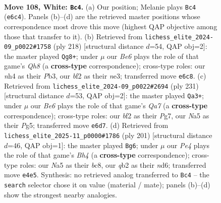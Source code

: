\documentclass[11pt]{article}
\begin{document}
\clearpage

\begin{figure}[p]\centering
\begin{subfigure}{0.46\textwidth}\centering
\resizebox{\linewidth}{!}{%
\newchessgame
\chessboard[
  setfen={8/6k1/n3B3/N7/Pp2P2n/8/1q3b1p/3K4 w - - 8 108},
  showmover=false,
  pgfstyle=straightmove, color=movearrow, markmove={e6-c4}
]}
\caption{}
\end{subfigure}\hfill
\begin{subfigure}{0.46\textwidth}\centering
\resizebox{\linewidth}{!}{%
\newchessgame
\chessboard[
  setfen={7Q/1p6/p7/P1K5/8/1P2n3/2P3k1/5q2 w - - 0 110},
  showmover=false,
  pgfstyle=straightmove, color=movearrow, markmove={h8-g8}
]}
\caption{}
\end{subfigure}
\\[4pt]
\begin{subfigure}{0.46\textwidth}\centering
\resizebox{\linewidth}{!}{%
\newchessgame
\chessboard[
  setfen={3Q4/4P1pk/3K4/6p1/3p4/8/q7/8 b - - 25 116},
  showmover=false,
  pgfstyle=straightmove, color=movearrow, markmove={a2-a3}
]}
\caption{}
\end{subfigure}\hfill
\begin{subfigure}{0.46\textwidth}\centering
\resizebox{\linewidth}{!}{%
\newchessgame
\chessboard[
  setfen={2B5/8/3N4/7b/3k1p1p/7P/r7/6K1 b - - 11 101},
  showmover=false,
  pgfstyle=straightmove, color=movearrow, markmove={h5-g6}
]}
\caption{}
\end{subfigure}
\caption{\textbf{Move 108, White: \texttt{Bc4}.} (a) Our position; Melanie plays \texttt{Bc4} (\texttt{e6c4}). Panels (b)--(d) are the retrieved master positions whose correspondence most drove this move (highest QAP objective among those that transfer to it). (b) Retrieved from \texttt{lichess\_elite\_2024-09\_p0022\#1758} (ply 218) [structural distance $d$=54, QAP obj=2]: the master played \texttt{Qg8+}; under $\mu$ our \emph{Be6} plays the role of that game's \emph{Qh8} (a \textbf{cross-type} correspondence); cross-type roles: our \emph{n}h4 as their \emph{P}b3, our \emph{b}f2 as their \emph{n}e3; transferred move \texttt{e6c8}. (c) Retrieved from \texttt{lichess\_elite\_2024-09\_p0022\#2694} (ply 231) [structural distance $d$=53, QAP obj=2]: the master played \texttt{Qa3+}; under $\mu$ our \emph{Be6} plays the role of that game's \emph{Qa7} (a \textbf{cross-type} correspondence); cross-type roles: our \emph{b}f2 as their \emph{P}g7, our \emph{N}a5 as their \emph{P}g5; transferred move \texttt{e6d7}. (d) Retrieved from \texttt{lichess\_elite\_2025-11\_p0000\#1786} (ply 201) [structural distance $d$=46, QAP obj=1]: the master played \texttt{Bg6}; under $\mu$ our \emph{Pe4} plays the role of that game's \emph{Bh4} (a \textbf{cross-type} correspondence); cross-type roles: our \emph{N}a5 as their \emph{b}c8, our \emph{q}b2 as their \emph{n}d6; transferred move \texttt{e4e5}. Synthesis: no retrieved analog transferred to \texttt{Bc4} -- the \texttt{search} selector chose it on value (material / mate); panels (b)--(d) show the strongest nearby analogies.}
\label{fig:thought-m214}
\end{figure}
\end{document}
